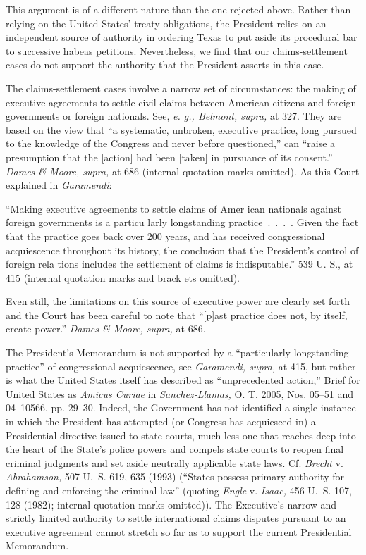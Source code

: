   This argument is of a different nature than the one rejected above.
Rather than relying on the United States' treaty obligations, the
President relies on an independent source of authority in ordering
Texas to put aside its procedural bar to successive habeas petitions.
Nevertheless, we find that our claims-settlement cases do not support
the authority that the President asserts in this case.

  The claims-settlement cases involve a narrow set of circumstances:
the making of executive agreements to settle civil claims between
American citizens and foreign governments or foreign nationals. See,
\emph{e. g., Belmont, supra,} at 327. They are based on the view that
``a systematic, unbroken, executive practice, long pursued to the
knowledge of the Congress and never before questioned,'' can ``raise
a presumption that the [action] had been [taken] in pursuance of its
consent.'' \emph{Dames \& Moore, supra,} at 686 (internal quotation marks
omitted). As this Court explained in \emph{Garamendi}:

    ``Making executive agreements to settle claims of Amer ican
    nationals against foreign governments is a particu larly
    longstanding practice~.~.~.~. Given the fact that the
    practice goes back over 200 years, and has received congressional
    acquiescence throughout its history, the conclusion that the
    President's control of foreign rela tions includes the settlement
    of claims is indisputable.'' 539 U. S., at 415 (internal
    quotation marks and brack ets omitted).

\noindent Even still, the limitations on this source of executive power are
clearly set forth and the Court has been careful to note \newpage  that
``[p]ast practice does not, by itself, create power.'' \emph{Dames \&
Moore, supra,} at 686.

  The President's Memorandum is not supported by a ``particularly
longstanding practice'' of congressional acquiescence, see \emph{Garamendi,
supra,} at 415, but rather is what the United States itself has
described as ``unprecedented action,'' Brief for United States as
\emph{Amicus Curiae} in \emph{Sanchez-Llamas,} O. T. 2005, Nos. 05--51 and
04--10566, pp. 29--30. Indeed, the Government has not identified
a single instance in which the President has attempted (or Congress
has acquiesced in) a Presidential directive issued to state courts,
much less one that reaches deep into the heart of the State's police
powers and compels state courts to reopen final criminal judgments
and set aside neutrally applicable state laws. Cf. \emph{Brecht} v.
\emph{Abrahamson,} 507 U.~S. 619, 635 (1993) (``States possess primary
authority for defining and enforcing the criminal law'' (quoting
\emph{Engle} v. \emph{Isaac,} 456 U.~S. 107, 128 (1982); internal quotation
marks omitted)). The Executive's narrow and strictly limited
authority to settle international claims disputes pursuant to an
executive agreement cannot stretch so far as to support the current
Presidential Memorandum.

